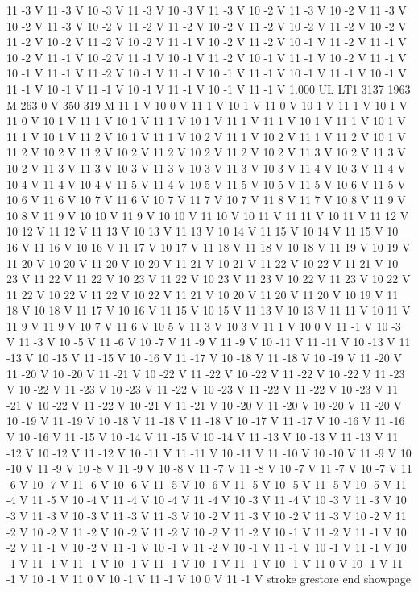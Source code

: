 {11 -3 V
11 -3 V
10 -3 V
11 -3 V
10 -3 V
11 -3 V
10 -2 V
11 -3 V
10 -2 V
11 -3 V
10 -2 V
11 -3 V
10 -2 V
11 -2 V
11 -2 V
10 -2 V
11 -2 V
10 -2 V
11 -2 V
10 -2 V
11 -2 V
10 -2 V
11 -2 V
10 -2 V
11 -1 V
10 -2 V
11 -2 V
10 -1 V
11 -2 V
11 -1 V
10 -2 V
11 -1 V
10 -2 V
11 -1 V
10 -1 V
11 -2 V
10 -1 V
11 -1 V
10 -2 V
11 -1 V
10 -1 V
11 -1 V
11 -2 V
10 -1 V
11 -1 V
10 -1 V
11 -1 V
10 -1 V
11 -1 V
10 -1 V
11 -1 V
10 -1 V
11 -1 V
10 -1 V
11 -1 V
10 -1 V
11 -1 V
1.000 UL
LT1
3137 1963 M
263 0 V
350 319 M
11 1 V
10 0 V
11 1 V
10 1 V
11 0 V
10 1 V
11 1 V
10 1 V
11 0 V
10 1 V
11 1 V
10 1 V
11 1 V
10 1 V
11 1 V
11 1 V
10 1 V
11 1 V
10 1 V
11 1 V
10 1 V
11 2 V
10 1 V
11 1 V
10 2 V
11 1 V
10 2 V
11 1 V
11 2 V
10 1 V
11 2 V
10 2 V
11 2 V
10 2 V
11 2 V
10 2 V
11 2 V
10 2 V
11 3 V
10 2 V
11 3 V
10 2 V
11 3 V
11 3 V
10 3 V
11 3 V
10 3 V
11 3 V
10 3 V
11 4 V
10 3 V
11 4 V
10 4 V
11 4 V
10 4 V
11 5 V
11 4 V
10 5 V
11 5 V
10 5 V
11 5 V
10 6 V
11 5 V
10 6 V
11 6 V
10 7 V
11 6 V
10 7 V
11 7 V
10 7 V
11 8 V
11 7 V
10 8 V
11 9 V
10 8 V
11 9 V
10 10 V
11 9 V
10 10 V
11 10 V
10 11 V
11 11 V
10 11 V
11 12 V
10 12 V
11 12 V
11 13 V
10 13 V
11 13 V
10 14 V
11 15 V
10 14 V
11 15 V
10 16 V
11 16 V
10 16 V
11 17 V
10 17 V
11 18 V
11 18 V
10 18 V
11 19 V
10 19 V
11 20 V
10 20 V
11 20 V
10 20 V
11 21 V
10 21 V
11 22 V
10 22 V
11 21 V
10 23 V
11 22 V
11 22 V
10 23 V
11 22 V
10 23 V
11 23 V
10 22 V
11 23 V
10 22 V
11 22 V
10 22 V
11 22 V
10 22 V
11 21 V
10 20 V
11 20 V
11 20 V
10 19 V
11 18 V
10 18 V
11 17 V
10 16 V
11 15 V
10 15 V
11 13 V
10 13 V
11 11 V
10 11 V
11 9 V
11 9 V
10 7 V
11 6 V
10 5 V
11 3 V
10 3 V
11 1 V
10 0 V
11 -1 V
10 -3 V
11 -3 V
10 -5 V
11 -6 V
10 -7 V
11 -9 V
11 -9 V
10 -11 V
11 -11 V
10 -13 V
11 -13 V
10 -15 V
11 -15 V
10 -16 V
11 -17 V
10 -18 V
11 -18 V
10 -19 V
11 -20 V
11 -20 V
10 -20 V
11 -21 V
10 -22 V
11 -22 V
10 -22 V
11 -22 V
10 -22 V
11 -23 V
10 -22 V
11 -23 V
10 -23 V
11 -22 V
10 -23 V
11 -22 V
11 -22 V
10 -23 V
11 -21 V
10 -22 V
11 -22 V
10 -21 V
11 -21 V
10 -20 V
11 -20 V
10 -20 V
11 -20 V
10 -19 V
11 -19 V
10 -18 V
11 -18 V
11 -18 V
10 -17 V
11 -17 V
10 -16 V
11 -16 V
10 -16 V
11 -15 V
10 -14 V
11 -15 V
10 -14 V
11 -13 V
10 -13 V
11 -13 V
11 -12 V
10 -12 V
11 -12 V
10 -11 V
11 -11 V
10 -11 V
11 -10 V
10 -10 V
11 -9 V
10 -10 V
11 -9 V
10 -8 V
11 -9 V
10 -8 V
11 -7 V
11 -8 V
10 -7 V
11 -7 V
10 -7 V
11 -6 V
10 -7 V
11 -6 V
10 -6 V
11 -5 V
10 -6 V
11 -5 V
10 -5 V
11 -5 V
10 -5 V
11 -4 V
11 -5 V
10 -4 V
11 -4 V
10 -4 V
11 -4 V
10 -3 V
11 -4 V
10 -3 V
11 -3 V
10 -3 V
11 -3 V
10 -3 V
11 -3 V
11 -3 V
10 -2 V
11 -3 V
10 -2 V
11 -3 V
10 -2 V
11 -2 V
10 -2 V
11 -2 V
10 -2 V
11 -2 V
10 -2 V
11 -2 V
10 -1 V
11 -2 V
11 -1 V
10 -2 V
11 -1 V
10 -2 V
11 -1 V
10 -1 V
11 -2 V
10 -1 V
11 -1 V
10 -1 V
11 -1 V
10 -1 V
11 -1 V
11 -1 V
10 -1 V
11 -1 V
10 -1 V
11 -1 V
10 -1 V
11 0 V
10 -1 V
11 -1 V
10 -1 V
11 0 V
10 -1 V
11 -1 V
10 0 V
11 -1 V
stroke
grestore
end
showpage
}
